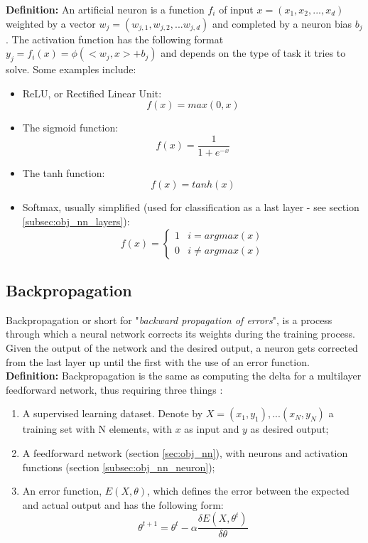 \textbf{Definition:} An artificial neuron is a function $f_i$ of input $x = (x_1, x_2, ... , x_d)$ weighted by a vector $w_j = (w_{j,1}, w_{j,2}, ... w_{j,d})$ and completed by a neuron bias $b_j$. The activation function has the following format $y_j = f_i(x) = \phi(< w_j, x > + b_j)$ \cite{backpropagation} and depends on the type of task it tries to solve. Some examples include:

\begin{itemize}
\item{ReLU, or Rectified Linear Unit: \[ f(x) = max(0, x) \]}
\item{The sigmoid function: \[ f(x) = \frac{1}{1 + e^{-x}} \]} 
\item{The tanh function: \[ f(x) = tanh(x) \]}
\item{Softmax, usually simplified (used for classification as a last layer - see section \ref{subsec:obj_nn_layers}): 
\[ f(x) = 
	\begin{cases} 
		1 & i = argmax(x) \\
		0 & i \neq argmax(x)
	\end{cases}
\]}
\end{itemize}

\subsection{Backpropagation}
\label{subsec:obj_nn_backpropagation}

Backpropagation or short for "\textit{backward propagation of errors}", is a process through which a neural network corrects its weights during the training process. Given the output of the network and the desired output, a neuron gets corrected from the last layer up until the first with the use of an error function.
\textbf{Definition:} Backpropagation is the same as computing the delta for a multilayer feedforward network, thus requiring three things \cite{brilliant:backpropagation}:  

\begin{enumerate}
\item{A supervised learning dataset. Denote by $X = (x_1, y_1), ... (x_N, y_N)$ a training set with N elements, with $x$ as input and $y$ as desired output;}
\item{A feedforward network (section \ref{sec:obj_nn}), with neurons and activation functions (section \ref{subsec:obj_nn_neuron});}
\item{An error function, $E(X, \theta)$, which defines the error between the expected and actual output and has the following form: \[ \theta^{t+1} = \theta^t - \alpha \frac{\delta E(X, \theta^t)}{\delta \theta} \]}
\end{enumerate}

